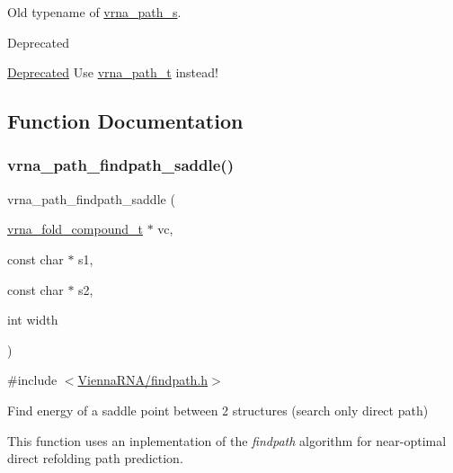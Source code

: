 Old typename of \hyperlink{group__direct__paths_structvrna__path__s}{vrna\+\_\+path\+\_\+s}. 

\begin{DoxyRefDesc}{Deprecated}
\item[\hyperlink{deprecated__deprecated000065}{Deprecated}]Use \hyperlink{group__direct__paths_ga818d4f3d1cf8723d6905990b08d909fe}{vrna\+\_\+path\+\_\+t} instead! \end{DoxyRefDesc}


\subsection{Function Documentation}
\mbox{\label{group__direct__paths_gad611574a76593e26021f177e7854b6b4}} 
\subsubsection{\texorpdfstring{vrna\+\_\+path\+\_\+findpath\+\_\+saddle()}{vrna\_path\_findpath\_saddle()}}
{\footnotesize\ttfamily vrna\+\_\+path\+\_\+findpath\+\_\+saddle (\begin{DoxyParamCaption}\item[{\hyperlink{group__fold__compound_ga1b0cef17fd40466cef5968eaeeff6166}{vrna\+\_\+fold\+\_\+compound\+\_\+t} $\ast$}]{vc,  }\item[{const char $\ast$}]{s1,  }\item[{const char $\ast$}]{s2,  }\item[{int}]{width }\end{DoxyParamCaption})}



{\ttfamily \#include $<$\hyperlink{findpath_8h}{Vienna\+R\+N\+A/findpath.\+h}$>$}



Find energy of a saddle point between 2 structures (search only direct path) 

This function uses an inplementation of the {\itshape findpath} algorithm \cite{flamm:2001} for near-\/optimal direct refolding path prediction.


